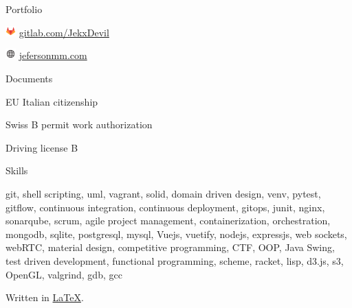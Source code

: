 \documentclass{cv} %
\def\iconsize{0.4cm}
\def\sidespacing{0.5cm}
\begin{document}
\begin{minipage}[b][0.9\paperheight][t]{0.29\linewidth}
\begin{rSection}{Portfolio}
        \item[]\includegraphics[width=\iconsize, trim={0cm 0.5cm 0cm 0cm}]{gitlab-icon.png}
        \href{https://gitlab.com/JekxDevil}{gitlab.com/JekxDevil}

        \item[]\includegraphics[width=\iconsize, trim={0cm 0.12cm 0.03cm 0cm}]{website.png}
        \href{http://jefersonmm.com}{jefersonmm.com}
    \end{rSection}

    \vspace{\sidespacing}

    \begin{rSection}{Documents}
        \item[] EU Italian citizenship
        \item[] Swiss B permit work authorization
        \item[] Driving license B
    \end{rSection}

    \tiny
    \begin{rSection}{Skills}
        \item[] git, shell scripting, uml, vagrant, solid, domain driven design,
        venv, pytest, gitflow, continuous integration, continuous deployment,
        gitops, junit, nginx, sonarqube, scrum, agile project management, containerization,
        orchestration,
        mongodb, sqlite, postgresql, mysql, %
        Vuejs, vuetify, nodejs, expressjs, web sockets, webRTC, material design, %
        competitive programming, CTF, OOP, Java Swing, test driven development,
        functional programming, scheme, racket, lisp, d3.js, s3, OpenGL, valgrind, gdb, gcc
    \end{rSection}
    \normalsize

    \vspace{1.8cm}
    Written in \href{https://github.com/JekxDevil/curriculum-vitae}{\LaTeX}.

\end{minipage}
\hspace{0.1cm}
\end{document}
